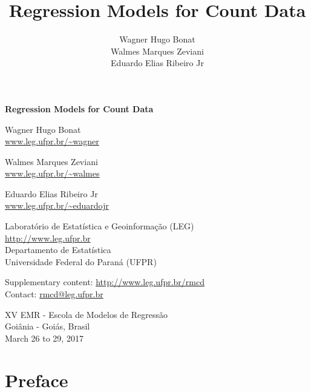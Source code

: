 \documentclass[9pt,a5paper,]{book}
\title{Regression Models for Count Data}
\author{Wagner Hugo Bonat \\ Walmes Marques Zeviani \\ Eduardo Elias Ribeiro Jr}
\date{}
\begin{document}
\maketitle

\thispagestyle{empty}
\cleardoublepage
\thispagestyle{empty}


\begin{flushleft}
  \Large \bf
  Regression Models for Count Data
\end{flushleft}
\vspace*{1.5em}

\begin{flushleft}
Wagner Hugo Bonat\\
\url{www.leg.ufpr.br/~wagner}

Walmes Marques Zeviani\\
\url{www.leg.ufpr.br/~walmes}

Eduardo Elias Ribeiro Jr\\
\url{www.leg.ufpr.br/~eduardojr}
\end{flushleft}
\vspace*{2em}

Laboratório de Estatística e Geoinformação (LEG)\\
\url{http://www.leg.ufpr.br}\\
Departamento de Estatística\\
Universidade Federal do Paraná (UFPR)

Supplementary content: \url{http://www.leg.ufpr.br/rmcd}\\
Contact: \url{rmcd@leg.ufpr.br}
\vspace*{\fill}

\begin{center}
XV EMR - Escola de Modelos de Regressão\\
Goiânia - Goiás, Brasil\\
March 26 to 29, 2017
\end{center}

\clearpage
\thispagestyle{empty}
\pagebreak

\setcounter{page}{1}

{
\setcounter{tocdepth}{1}
\tableofcontents
}
\chapter*{Preface}\label{preface}
\end{document}
